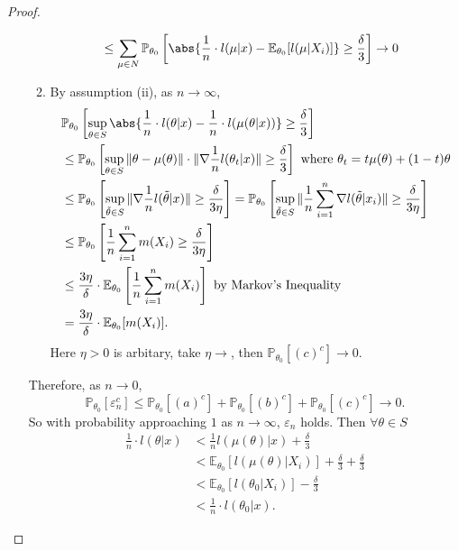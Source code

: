 \documentclass[a4paper]{article}
\begin{document}
\begin{proof}
\begin{itemize}[leftmargin=*]
\begin{enumerate}[label=(\alph*)]
\begin{equation*}
\begin{aligned}
					&\leq \sum\limits_{\mu \in N} \mathbb{P}_{\theta_0}\left[\abs{\frac{1}{n} \cdot l(\mu|x) - \mathbb{E}_{\theta_0}[l(\mu|X_i)]} \geq \frac{\delta}{3} \right] \to 0
				\end{aligned}
			\end{equation*}
			\item By assumption (ii), as $n \to \infty$,
			\begin{equation*}
				\begin{aligned}
					& \mathbb{P}_{\theta_0}\left[\sup\limits_{\theta \in S} \abs{\frac{1}{n} \cdot l(\theta|x) - \frac{1}{n} \cdot l(\mu(\theta|x))}\geq \frac{\delta}{3}\right] \\
					& \leq \mathbb{P}_{\theta_0}\left[\sup\limits_{\theta \in S} \Vert \theta - \mu(\theta) \Vert \cdot \Vert \nabla \frac{1}{n} l(\theta_t|x)\Vert \geq \frac{\delta}{3}\right] \text{ where } \theta_t = t \mu(\theta) + (1-t) \theta \\
					& \leq \mathbb{P}_{\theta_0}\left[\sup\limits_{\tilde{\theta} \in S} \Vert \nabla \frac{1}{n} l(\tilde{\theta}|x)\Vert \geq \frac{\delta}{3\eta}\right] = \mathbb{P}_{\theta_0}\left[\sup\limits_{\tilde{\theta} \in S} \Vert \frac{1}{n} \sum\limits_{i=1}^n \nabla l(\tilde{\theta}|x_i)\Vert \geq \frac{\delta}{3\eta}\right] \\
					& \leq \mathbb{P}_{\theta_0}\left[\frac{1}{n} \sum\limits_{i=1}^n m(X_i) \geq \frac{\delta}{3\eta}\right] \\
					& \leq \frac{3\eta}{\delta} \cdot \mathbb{E}_{\theta_0}\left[\frac{1}{n} \sum\limits_{i=1}^n m(X_i)\right] \text{ by Markov's Inequality} \\
					&= \frac{3\eta}{\delta} \cdot \mathbb{E}_{\theta_0}[m(X_i)].
				\end{aligned}	
			\end{equation*}
			\noindent Here $\eta > 0$ is arbitary, take $\eta \to$, then $\mathbb{P}_{\theta_0}[(c)^c] \to 0$.
		\end{enumerate}
		Therefore, as $n \to 0$,
		\begin{equation*}
			\mathbb{P}_{\theta_0}[\varepsilon_n^c] \leq \mathbb{P}_{\theta_0}[(a)^c] + \mathbb{P}_{\theta_0}[(b)^c] + \mathbb{P}_{\theta_0}[(c)^c] \to 0.
		\end{equation*}
		So with probability approaching $1$ as $n \to \infty$, $\varepsilon_n$ holds.
		Then $\forall \theta \in S$
		\begin{equation}
			\begin{aligned}
				\frac{1}{n} \cdot l(\theta|x) &< \frac{1}{n} l(\mu(\theta)|x) + \frac{\delta}{3} \\
				&< \mathbb{E}_{\theta_0}[l(\mu(\theta)|X_i)] + \frac{\delta}{3} + \frac{\delta}{3} \\
				&< \mathbb{E}_{\theta_0}[l(\theta_0|X_i)] - \frac{\delta}{3} \\
				&< \frac{1}{n} \cdot l(\theta_0|x). 
			\end{aligned}
		\end{equation}
	\end{itemize}
\end{proof}
\end{document}
